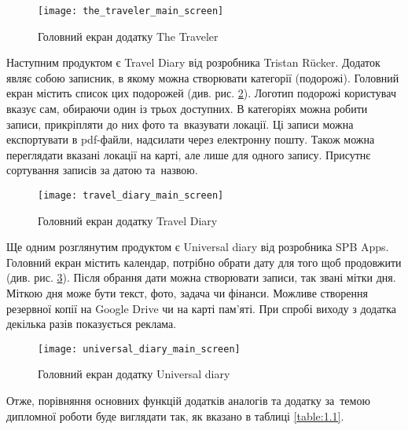 \documentclass[../main.tex]{subfiles}
\begin{document}
{\begin{figure}[H]
	\centering
	\texttt{[image: the\_traveler\_main\_screen]}
	\caption{Головний екран додатку The Traveler}
	\label{figure:1.2}
\end{figure}

Наступним продуктом є Travel Diary від розробника Tristan Rücker. Додаток являє собою записник, в якому можна створювати категорії (подорожі). Головний екран містить список цих подорожей (див. рис. \ref{figure:1.3}). Логотип подорожі користувач вказує сам, обираючи один із трьох доступних. В категоріях можна робити записи, прикріпляти до них фото та~вказувати локації. Ці записи можна експортувати в pdf-файли, надсилати через електронну пошту. Також можна переглядати вказані локації на карті, але лише для одного запису. Присутнє сортування записів за датою та~назвою.

\begin{figure}[H]
\centering
\texttt{[image: travel\_diary\_main\_screen]}
\caption{Головний екран додатку Travel Diary}
\label{figure:1.3}
\end{figure}

Ще одним розглянутим продуктом є Universal diary від розробника SPB Apps. Головний екран містить календар, потрібно обрати дату для того щоб продовжити (див. рис. \ref{figure:1.4}). Після обрання дати можна створювати записи, так звані мітки дня. Міткою дня може бути текст, фото, задача чи фінанси. Можливе створення резервної копії на Google Drive чи на карті пам'яті. При спробі виходу з додатка декілька разів показується реклама.

\begin{figure}[H]
\centering
\texttt{[image: universal\_diary\_main\_screen]}
\caption{Головний екран додатку Universal diary}
\label{figure:1.4}
\end{figure}

Отже, порівняння основних функцій додатків аналогів та додатку за~темою дипломної роботи буде виглядати так, як вказано в таблиці \ref{table:1.1}.

}
\end{document}
